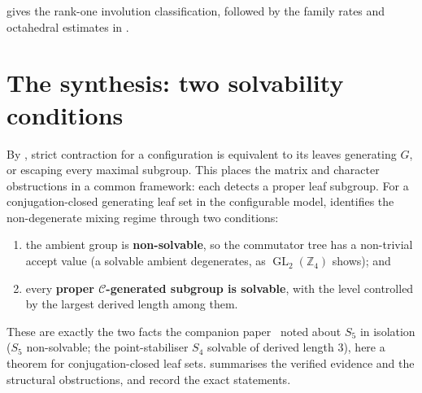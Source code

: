 \documentclass[11pt]{amsart}
\theoremstyle{definition}
\theoremstyle{remark}
\theoremstyle{plain}
\theoremstyle{plain}
\numberwithin{equation}{section}
\DeclareMathOperator{\GL}{GL}
\newcommand{\Z}{\mathbb{Z}}
\begin{document}
 gives the rank-one involution classification, followed
by the family rates and octahedral estimates in
.

\newpage
\section{The synthesis: two solvability conditions}
\label{sec:synthesis}

By , strict contraction for a configuration is
equivalent to its leaves generating $G$, or escaping every maximal
subgroup. This places the matrix and character obstructions in a common
framework: each detects a proper leaf subgroup. For a conjugation-closed
generating leaf set in the configurable model, 
identifies the non-degenerate mixing regime through two conditions:

\begin{enumerate}[nosep,label=(\roman*)]
\item the ambient group is \textbf{non-solvable}, so the commutator tree has a non-trivial
  accept value (a solvable ambient degenerates, as $\GL_2(\Z_4)$ shows); and
\item every \textbf{proper $\mathcal{C}$-generated subgroup is solvable}, with the level
  controlled by the largest derived length among them.
\end{enumerate}

These are exactly the two facts the companion paper~\cite{ZermenoS5} noted about $S_5$ in isolation
($S_5$ non-solvable; the point-stabiliser $S_4$ solvable of derived length $3$), here a
theorem for conjugation-closed leaf sets.  summarises the verified
evidence and the structural obstructions, and  record the
exact statements.
\end{document}
